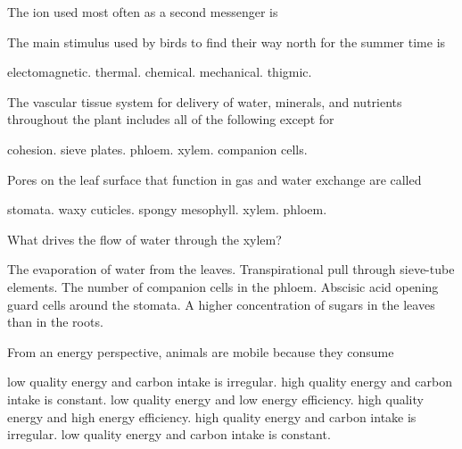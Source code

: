 \question
The ion used most often as a second messenger is

\begin{choices}
\correctchoice {} %
\choice {} %
\choice {} %
\choice {} %
\choice {} %
\end{choices}

\question
The main stimulus used by birds to find their way north for the summer time is 
\begin{choices}
\correctchoice electomagnetic. %
\choice thermal. %
\choice chemical. %
\choice mechanical. %
\choice thigmic. %
\end{choices}


\question
The vascular tissue system for delivery of water, minerals, and nutrients throughout the plant includes all of the following except for

\begin{choices}
\correctchoice cohesion. %
\choice sieve plates. %
\choice phloem. %
\choice xylem. %
\choice companion cells. %
\end{choices}


\question
Pores on the leaf surface that function in gas and water exchange are called

\begin{choices}
\correctchoice stomata. %
\choice waxy cuticles. %
\choice spongy mesophyll. %
\choice xylem. %
\choice phloem. %
\end{choices}


\question
What drives the flow of water through the xylem?

\begin{choices}
\correctchoice The evaporation of water from the leaves. %
\choice Transpirational pull through sieve-tube elements. %
\choice The number of companion cells in the phloem.  %
\choice Abscisic acid opening guard cells around the stomata. %
\choice A higher concentration of sugars in the leaves than in the roots. %
\end{choices}


\question
From an energy perspective, animals are mobile because they consume

\begin{choices}
\correctchoice low quality energy and carbon intake is irregular.%
\choice high quality energy and carbon intake is constant. %
\choice low quality energy and low energy efficiency.%
\choice high quality energy and high energy efficiency. %
\choice high quality energy and carbon intake is irregular. %
\choice low quality energy and carbon intake is constant. %
\end{choices}


